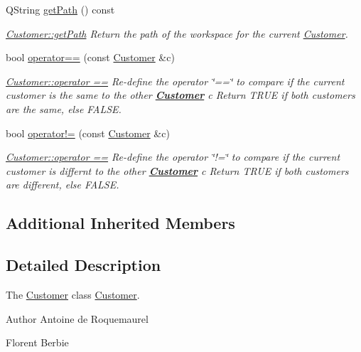 \begin{DoxyCompactItemize}
Q\-String \hyperlink{classModels_1_1Customer_ac1aec0fb9058333e1a2496b1c29049af}{get\-Path} () const 
\begin{DoxyCompactList}\small\item\em \hyperlink{classModels_1_1Customer_ac1aec0fb9058333e1a2496b1c29049af}{Customer\-::get\-Path} Return the path of the workspace for the current \hyperlink{classModels_1_1Customer}{Customer}. \end{DoxyCompactList}\item 
bool \hyperlink{classModels_1_1Customer_ab379700fa93f5b9eb0f8546b03aff70f}{operator==} (const \hyperlink{classModels_1_1Customer}{Customer} \&c)
\begin{DoxyCompactList}\small\item\em \hyperlink{classModels_1_1Customer_ab379700fa93f5b9eb0f8546b03aff70f}{Customer\-::operator ==} Re-\/define the operator \char`\"{}==\char`\"{} to compare if the current customer is the same to the other {\bfseries \hyperlink{classModels_1_1Customer}{Customer}} {\itshape c} Return T\-R\-U\-E if both customers are the same, else F\-A\-L\-S\-E. \end{DoxyCompactList}\item 
bool \hyperlink{classModels_1_1Customer_a07e61dd9ad79b6be765ea1dabccf1e18}{operator!=} (const \hyperlink{classModels_1_1Customer}{Customer} \&c)
\begin{DoxyCompactList}\small\item\em \hyperlink{classModels_1_1Customer_ab379700fa93f5b9eb0f8546b03aff70f}{Customer\-::operator ==} Re-\/define the operator \char`\"{}!=\char`\"{} to compare if the current customer is differnt to the other {\bfseries \hyperlink{classModels_1_1Customer}{Customer}} {\itshape c} Return T\-R\-U\-E if both customers are different, else F\-A\-L\-S\-E. \end{DoxyCompactList}\end{DoxyCompactItemize}
\subsection*{Additional Inherited Members}


\subsection{Detailed Description}
The \hyperlink{classModels_1_1Customer}{Customer} class \hyperlink{classModels_1_1Customer}{Customer}. 

\begin{DoxyAuthor}{Author}
Antoine de Roquemaurel 

Florent Berbie 
\end{DoxyAuthor}


